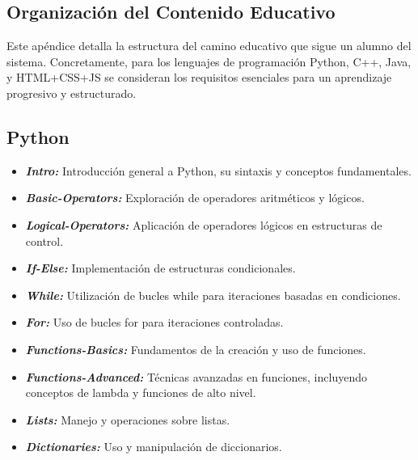 \begin{appendices}
\chapter{Organización del Contenido Educativo} \label{apendiceestructura}

Este apéndice detalla la estructura del camino educativo que sigue un alumno del sistema. Concretamente, para los lenguajes de programación Python, C++, Java, y HTML+CSS+JS se consideran los requisitos esenciales para un aprendizaje progresivo y estructurado.

\section{Python}
\begin{itemize}
    \item \textbf{\textit{Intro:}} Introducción general a Python, su sintaxis y conceptos fundamentales.
    \item \textbf{\textit{Basic-Operators:}} Exploración de operadores aritméticos y lógicos.
    \item \textbf{\textit{Logical-Operators:}} Aplicación de operadores lógicos en estructuras de control.
    \item \textbf{\textit{If-Else:}} Implementación de estructuras condicionales.
    \item \textbf{\textit{While:}} Utilización de bucles while para iteraciones basadas en condiciones.
    \item \textbf{\textit{For:}} Uso de bucles for para iteraciones controladas.
    \item \textbf{\textit{Functions-Basics:}} Fundamentos de la creación y uso de funciones.
    \item \textbf{\textit{Functions-Advanced:}} Técnicas avanzadas en funciones, incluyendo conceptos de lambda y funciones de alto nivel.
    \item \textbf{\textit{Lists:}} Manejo y operaciones sobre listas.
    \item \textbf{\textit{Dictionaries:}} Uso y manipulación de diccionarios.
\end{itemize}


\end{appendices}
